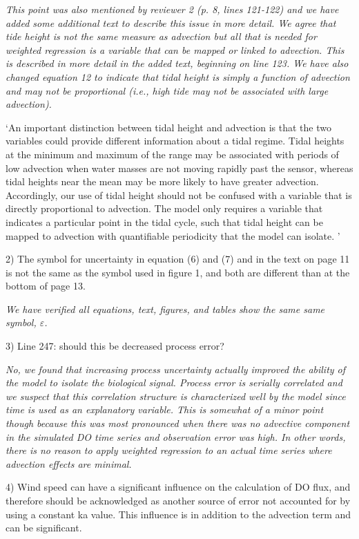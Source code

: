 \documentclass[letterpaper,12pt]{article}\usepackage[]{graphicx}\usepackage[]{color}
\begin{document}
{\it This point was also mentioned by reviewer 2 (p. 8, lines 121-122) and we have added some additional text to describe this issue in more detail.  We agree that tide height is not the same measure as advection but all that is needed for weighted regression is a variable that can be mapped or linked to advection.  This is described in more detail in the added text, beginning on line 123.  We have also changed equation 12 to indicate that tidal height is simply a function of advection and may not be proportional (i.e., high tide may not be associated with large advection).

`An important distinction between tidal height and advection is that the two variables could provide different information about a tidal regime.  Tidal heights at the minimum and maximum of the range may be associated with periods of low advection when water masses are not moving rapidly past the sensor, whereas tidal heights near the mean may be more likely to have greater advection.  Accordingly, our use of tidal height should not be confused with a variable that is directly proportional to advection.  The model only requires a variable that indicates a particular point in the tidal cycle, such that tidal height can be mapped to advection with quantifiable periodicity that the model can isolate.     
'
}

2) The symbol for uncertainty in equation (6) and (7) and in the text on page 11 is not the same as the symbol used in figure 1, and both are different than at the bottom of page 13.

{\it We have verified all equations, text, figures, and tables show the same same symbol, $\varepsilon$.}

3) Line 247: should this be decreased process error?

{\it No, we found that increasing process uncertainty actually improved the ability of the model to isolate the biological signal.  Process error is serially correlated and we suspect that this correlation structure is characterized well by the model since time is used as an explanatory variable.  This is somewhat of a minor point though because this was most pronounced when there was no advective component in the simulated DO time series and observation error was high.  In other words, there is no reason to apply weighted regression to an actual time series where advection effects are minimal.}

4) Wind speed can have a significant influence on the calculation of DO flux, and therefore should be acknowledged as another source of error not accounted for by using a constant ka value. This influence is in addition to the advection term and can be significant.
\end{document}
